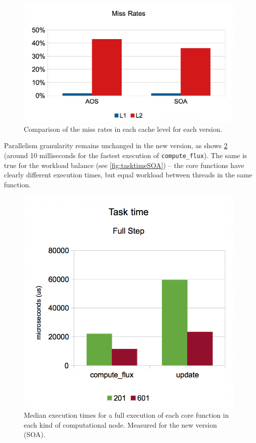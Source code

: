 \documentclass[abstract=on,9pt,twocolumn]{scrartcl}
\begin{document}
\begin{figure}[!htp]
	\begin{center}
		\includegraphics[width=\columnwidth]{images/report.april/missrates.png}
	\end{center}
	\caption{Comparison of the miss rates in each cache level for each version.}
	\label{fig:missrates}
\end{figure}

Parallelism granularity remains unchanged in the new version, as shows \cref{fig:steptimeSOA} (around 10 milliseconds for the fastest execution of \texttt{compute\_flux}). The same is true for the workload balance (see \cref{fig:tasktimeSOA}) -- the core functions have clearly different execution times, but equal workload between threads in the same function.

\begin{figure}[!p]
	\begin{center}
		\includegraphics[width=\columnwidth]{images/report.april/steptimeSOA.png}
	\end{center}
	\caption{Median execution times for a full execution of each core function in each kind of computational node. Measured for the new version (SOA).}
	\label{fig:steptimeSOA}
\end{figure}
\end{document}
